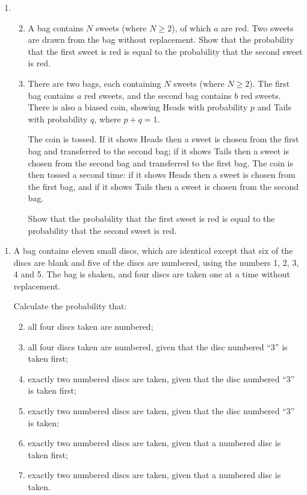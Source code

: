 \documentclass[a4, 11pt]{report}
\newlength{\qspace}
\newcounter{qnumber}
\newenvironment{question}%
 {\vspace{\qspace}
  \begin{enumerate}[\bfseries 1\quad][10]%
    \setcounter{enumi}{\value{qnumber}}%
    \item%
 }
{
  \end{enumerate}
  \filbreak
  \stepcounter{qnumber}
 }
\newenvironment{questionparts}[1][1]%
 {
  \begin{enumerate}[\bfseries (i)]%
    \setcounter{enumii}{#1}
    \addtocounter{enumii}{-1}
    \setlength{\itemsep}{5mm}
    \setlength{\parskip}{8pt}
 }
 {
  \end{enumerate}
 }
\def\ge{\geqslant}
\begin{document}
\begin{question}
\begin{questionparts}
\item A bag contains $N$ sweets (where $N \ge 2$),
of which $a$ are red. Two sweets are drawn
from the bag without replacement. Show that
the probability that the first sweet is red
is equal to the probability that the second sweet is red.

\item There are two bags, each containing $N$ sweets (where $N \ge 2$).
The first bag contains $a$ red sweets, and the
second bag contains $b$ red sweets. There is also a
biased coin, showing Heads with probability $p$ and Tails with probability $q$, where $p+q = 1$.

The coin is tossed. If it shows Heads then a
sweet is chosen from the first bag and transferred
to the second bag; if it shows Tails then a sweet
is chosen from the second bag and transferred
to the first bag. The coin is then tossed a second time:
if it shows Heads then a sweet is chosen from the first bag,
and if it shows Tails then a sweet is chosen from the second bag.

Show that the probability that the first sweet
is red is equal to the probability that the second sweet is red.
\end{questionparts}
\end{question}

\begin{question}
A bag contains eleven small discs, 
which are identical except that six of the discs are blank 
and five of the discs are numbered, 
using the numbers 1, 2, 3, 4 and 5. 
The bag is shaken, and four discs are taken one at a time without replacement.

Calculate the probability that:
\begin{questionparts}
\item all four discs taken are numbered;
\item all four discs taken are numbered, 
given that the disc numbered ``3'' is taken first;
\item exactly two numbered discs are taken, 
given that the disc numbered ``3'' is taken first;
\item exactly two numbered discs are taken, 
given that the disc numbered ``3'' is taken;
\item
exactly two numbered discs are taken, 
given that a numbered disc is taken first;
\item exactly two numbered discs are taken, 
given that a numbered disc is taken.
\end{questionparts}
\end{question}
\end{document}
